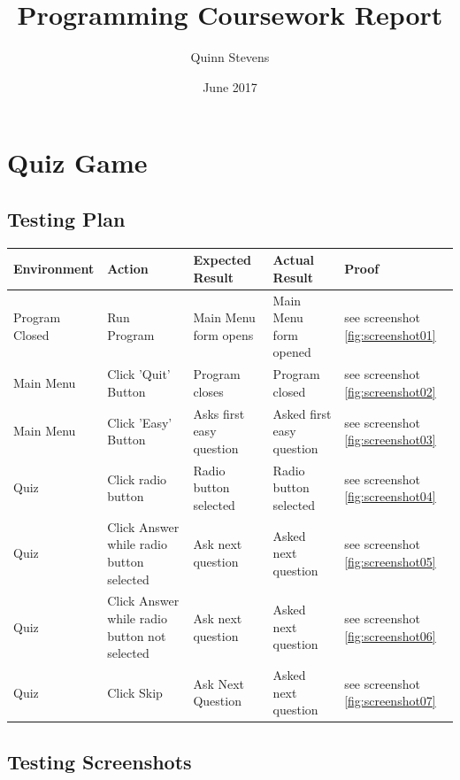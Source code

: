 \documentclass{report}
\title{Programming Coursework Report}
\author{Quinn Stevens}
\date{June 2017}
\begin{document}
\tabulinesep=1.2mm
\maketitle

\tableofcontents

    \part{Quiz Game}
    \chapter{Testing Plan}
    
    \begin{center}
      \begin{tabu} {|X[c]|X[c]|X[c]|X[c]|X[c]|}
        \hline
        Environment & Action & Expected Result & Actual Result & Proof\\
        \hline
        Program Closed & Run Program & Main Menu form opens & Main Menu form opened & see screenshot \ref{fig:screenshot01}\\
        \hline
        Main Menu & Click 'Quit' Button & Program closes & Program closed & see screenshot \ref{fig:screenshot02}\\
        \hline
        Main Menu & Click 'Easy' Button & Asks first easy question & Asked first easy question & see screenshot \ref{fig:screenshot03}\\
        \hline
        Quiz & Click radio button & Radio button selected & Radio button selected & see screenshot \ref{fig:screenshot04}\\
        \hline
        Quiz & Click Answer while radio button selected & Ask next question & Asked next question & see screenshot \ref{fig:screenshot05} \\
        \hline
        Quiz & Click Answer while radio button not selected & Ask next question & Asked next question & see screenshot \ref{fig:screenshot06} \\
        \hline
        Quiz & Click Skip & Ask Next Question & Asked next question & see screenshot \ref{fig:screenshot07}\\
        \hline
      \end{tabu}
    \end{center}
    
    \chapter{Testing Screenshots}
    
\end{document}
